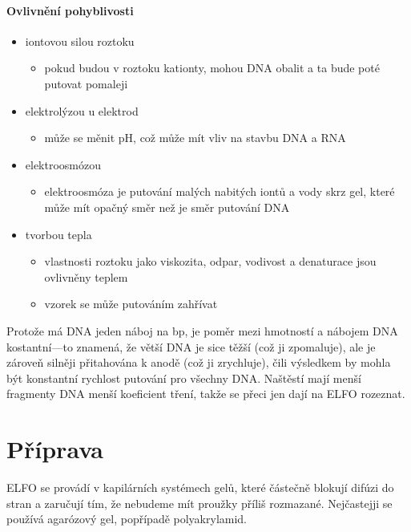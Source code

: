 \documentclass[DIV=8]{scrreprt}
\begin{document}
\paragraph{Ovlivnění pohyblivosti}
\begin{itemize}[nosep]
    \item iontovou silou roztoku
\begin{itemize}[nosep]
    \item pokud budou v roztoku kationty, mohou DNA obalit a ta bude poté putovat pomaleji
\end{itemize}

    \item elektrolýzou u elektrod
\begin{itemize}[nosep]
    \item může se měnit pH, což může mít vliv na stavbu DNA a RNA
\end{itemize}

    \item elektroosmózou
\begin{itemize}[nosep]
    \item elektroosmóza je putování malých nabitých iontů a vody skrz gel, které může mít opačný směr než je směr putování DNA
\end{itemize}

    \item tvorbou tepla
\begin{itemize}[nosep]
    \item vlastnosti roztoku jako viskozita, odpar, vodivost a denaturace jsou ovlivněny teplem
    \item vzorek se může putováním zahřívat
\end{itemize}

\end{itemize}



Protože má DNA jeden náboj na bp, je poměr mezi hmotností a nábojem DNA kostantní---to znamená, že větší DNA je sice těžší (což ji zpomaluje), ale je zároveň silněji přitahována k anodě (což ji zrychluje), čili výsledkem by mohla být konstantní rychlost putování pro všechny DNA. Naštěstí mají menší fragmenty DNA menší koeficient tření, takže se přeci jen dají na ELFO rozeznat.

\section{Příprava} \label{Příprava}


ELFO se provádí v kapilárních systémech gelů, které částečně blokují difúzi do stran a zaručují tím, že nebudeme mít proužky příliš rozmazané. Nejčastejji se používá agarózový gel, popřípadě polyakrylamid.
\end{document}
